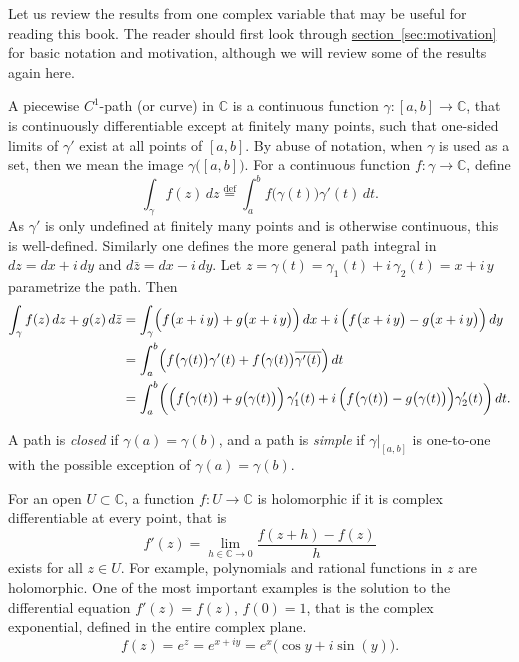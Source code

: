 \documentclass[12pt,openany]{book}
\newcommand{\C}{{\mathbb{C}}}
\theoremstyle{plain}
\theoremstyle{remark}
\theoremstyle{definition}
\theoremstyle{exercise}
\theoremstyle{example}
\newcommand{\sectionref}[1]{\hyperref[#1]{section~\ref*{#1}}}
\begin{document}

Let us review the results from one complex variable that may be useful for
reading this book.
The reader should first look through \sectionref{sec:motivation}
for basic notation and motivation, although we will review some of the
results again here.

A piecewise $C^1$-path (or curve) in $\C$
is a continuous function $\gamma \colon [a,b] \to \C$,
that is continuously differentiable except at finitely many points,
such that one-sided limits of $\gamma'$ exist at all points of $[a,b]$.
By abuse of notation, when $\gamma$ is used as a set, then we mean
the image
$\gamma\bigl([a,b]\bigr)$.
For a continuous function $f \colon \gamma \to \C$, define
\begin{equation*}
\int_\gamma f(z) \, dz 
\overset{\text{def}}{=}
\int_a^b f\bigl(\gamma(t)\bigr) \gamma'(t) \, dt .
\end{equation*}
As $\gamma'$ is only undefined at finitely many points and is otherwise
continuous, this is well-defined.  Similarly one defines the more general
path integral in $dz = dx + i\,dy$ and $d\bar{z} = dx - i\, dy$.
Let
$z = \gamma(t) = \gamma_1(t) + i \, \gamma_2(t) = x + i\, y$
parametrize the path.  Then
\begin{equation*}
\begin{split}
\int_\gamma f(z) \, dz + g(z) \, d\bar{z}
& =
\int_\gamma
\Bigl(f\bigl(x+i\, y\bigr) + g\bigl(x+i\, y\bigr) \Bigr) \, dx
+
i \, \Bigl( f\bigl(x+i\, y\bigr) - g\bigl(x+i\, y\bigr) \Bigr) \, dy
\\
& =
\int_a^b
\Bigl(
f\bigl(\gamma(t)\bigr) \gamma'(t)
+
f\bigl(\gamma(t)\bigr) \overline{\gamma'(t)}
\Bigr) \, dt
\\
& =
\int_a^b
\biggl(
\Bigl(f\bigl(\gamma(t)\bigr) + g\bigl(\gamma(t)\bigr) \Bigr) \,
\gamma_1'(t)
+
i \, \Bigl( f\bigl(\gamma(t)\bigr) - g\bigl(\gamma(t)\bigr) \Bigr)
\gamma_2'(t)
\biggr)
\, dt .
\end{split}
\end{equation*}

A path is \emph{closed}
if $\gamma(a) = \gamma(b)$,
and a path is \emph{simple}
if $\gamma|_{[a,b]}$ is one-to-one
with the possible exception of $\gamma(a) = \gamma(b)$.

For an open $U \subset \C$,
a function $f \colon U \to \C$ is holomorphic if it is complex
differentiable at every point, that is
\begin{equation*}
f'(z) = \lim_{h \in \C \to 0} \frac{f(z+h) - f(z)}{h}
\end{equation*}
exists for all $z \in U$.  For example, polynomials and rational
functions in $z$ are holomorphic.  One of the most important examples
is the solution to the differential equation $f'(z) = f(z)$, $f(0) = 1$, that is
the complex exponential, defined in the entire complex plane.
\begin{equation*}
f(z) = e^z = e^{x+iy} = e^x \bigl( \cos y + i \sin(y) \bigr) .
\end{equation*}
\end{document}
